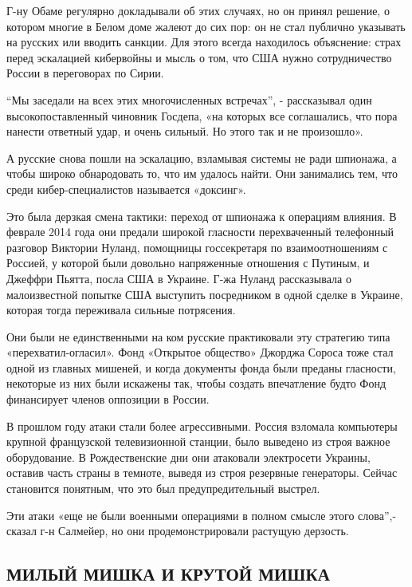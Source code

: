 Г-ну Обаме регулярно докладывали об этих случаях, но он принял решение,
о котором многие в Белом доме жалеют до сих пор: он не стал публично
указывать на русских или вводить санкции. Для этого всегда находилось
объяснение: страх перед эскалацией кибервойны и мысль о том, что США
нужно сотрудничество России в переговорах по Сирии.

``Мы заседали на всех этих многочисленных встречах'', - рассказывал один
высокопоставленный чиновник Госдепа, «на которых все соглашались, что
пора нанести ответный удар, и очень сильный. Но этого так и не
произошло».

А русские снова пошли на эскалацию, взламывая системы не ради шпионажа,
а чтобы широко обнародовать то, что им удалось найти. Они занимались
тем, что среди кибер-специалистов называется «доксинг».

Это была дерзкая смена тактики: переход от шпионажа к операциям влияния.
В феврале 2014 года они предали широкой гласности перехваченный
телефонный разговор Виктории Нуланд, помощницы госсекретаря по
взаимоотношениям с Россией, у которой были довольно напряженные
отношения с Путиным, и Джеффри Пьятта, посла США в Украине. Г-жа Нуланд
рассказывала о малоизвестной попытке США выступить посредником в одной
сделке в Украине, которая тогда переживала сильные потрясения.

Они были не единственными на ком русские практиковали эту стратегию типа
«перехватил-огласил». Фонд «Открытое общество» Джорджа Сороса тоже стал
одной из главных мишеней, и когда документы фонда были преданы
гласности, некоторые из них были искажены так, чтобы создать впечатление
будто Фонд финансирует членов оппозиции в России.

В прошлом году атаки стали более агрессивными. Россия взломала
компьютеры крупной французской телевизионной станции, было выведено из
строя важное оборудование. В Рождественские дни они атаковали
электросети Украины, оставив часть страны в темноте, выведя из строя
резервные генераторы. Сейчас становится понятным, что это был
предупредительный выстрел.

Эти атаки «еще не были военными операциями в полном смысле этого
слова'',- сказал г-н Салмейер, но они продемонстрировали растущую
дерзость.

\hypertarget{ux43cux438ux43bux44bux439-ux43cux438ux448ux43aux430-ux438-ux43aux440ux443ux442ux43eux439-ux43cux438ux448ux43aux430}{%
\subsection{\texorpdfstring{\textbf{МИЛЫЙ МИШКА И КРУТОЙ
МИШКА}}{МИЛЫЙ МИШКА И КРУТОЙ МИШКА}}\label{ux43cux438ux43bux44bux439-ux43cux438ux448ux43aux430-ux438-ux43aux440ux443ux442ux43eux439-ux43cux438ux448ux43aux430}}


